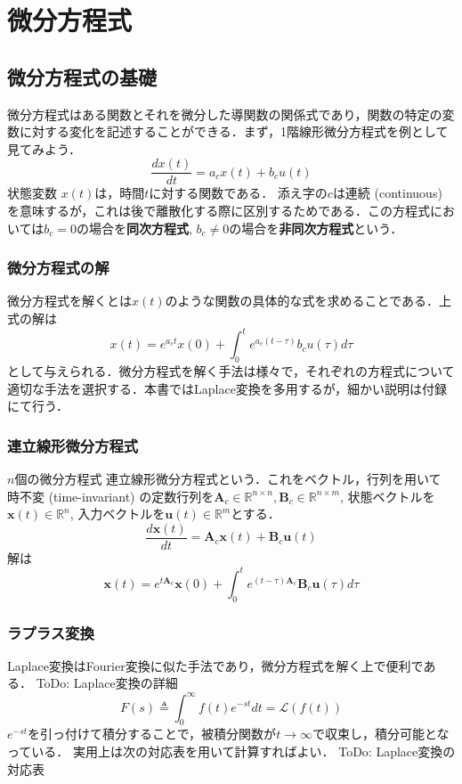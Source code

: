 \section{微分方程式}
\subsection{微分方程式の基礎}
微分方程式はある関数とそれを微分した導関数の関係式であり，関数の特定の変数に対する変化を記述することができる．まず，1階線形微分方程式を例として見てみよう．
\begin{equation}
\frac{dx(t)}{dt}=a_c x(t)+b_c u(t)
\end{equation}
状態変数 $x(t)$は，時間$t$に対する関数である．
添え字の$c$は連続 (continuous) を意味するが，これは後で離散化する際に区別するためである．この方程式においては$b_c=0$の場合を\textbf{同次方程式}, $b_c\neq 0$の場合を\textbf{非同次方程式}という．
\subsubsection{微分方程式の解}
微分方程式を解くとは$x(t)$のような関数の具体的な式を求めることである．上式の解は
\begin{equation}
x(t)=e^{a_c t}x(0)+\int_0^t e^{a_c (t-\tau)}b_c u(\tau) d\tau
\end{equation}
として与えられる．微分方程式を解く手法は様々で，それぞれの方程式について適切な手法を選択する．本書ではLaplace変換を多用するが，細かい説明は付録にて行う．
\subsubsection{連立線形微分方程式}
$n$個の微分方程式
連立線形微分方程式という．これをベクトル，行列を用いて
時不変 (time-invariant) の定数行列を$\mathbf{A}_c \in \mathbb{R}^{n\times n}, \mathbf{B}_c \in \mathbb{R}^{n\times m}$, 状態ベクトルを$\mathbf{x}(t)\in\mathbb{R}^n$, 入力ベクトルを$\mathbf{u}(t)\in\mathbb{R}^m$とする．
\begin{equation}
\frac{d\mathbf{x}(t)}{dt} = \mathbf{A}_c\mathbf{x}(t) + \mathbf{B}_c\mathbf{u}(t)
\end{equation}
解は
\begin{equation}
\mathbf{x}(t)=e^{t\mathbf{A}_c}\mathbf{x}(0)+\int_0^t e^{(t-\tau)\mathbf{A}_c}\mathbf{B}_c\mathbf{u}(\tau) d\tau
\end{equation}
\subsubsection{ラプラス変換}
Laplace変換はFourier変換に似た手法であり，微分方程式を解く上で便利である．
ToDo: Laplace変換の詳細
\begin{equation}
F(s)\triangleq\int_0^{\infty} f(t) e^{-st} dt=\mathcal{L}(f(t))
\end{equation}
$e^{-st}$を引っ付けて積分することで，被積分関数が$t\to \infty$で収束し，積分可能となっている．
実用上は次の対応表を用いて計算すればよい．
ToDo: Laplace変換の対応表
